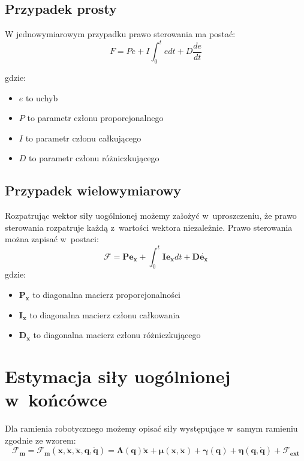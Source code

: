 \subsection{Przypadek prosty}
W jednowymiarowym przypadku prawo sterowania ma postać:
\begin{equation}
F = Pe + I\int_{0}^{t}e dt + D\frac{de}{dt}
\end{equation}

gdzie:
\begin{itemize}
	\item $e$ to uchyb
	\item $P$ to parametr członu proporcjonalnego
	\item $I$ to parametr członu całkującego
	\item $D$ to parametr członu różniczkującego
\end{itemize}


\subsection{Przypadek wielowymiarowy}
Rozpatrując wektor siły uogólnionej możemy założyć w~uproszczeniu, że prawo sterowania rozpatruje każdą z~wartości wektora niezależnie. Prawo sterowania można zapisać w~postaci:
\begin{equation}
\boldsymbol{\mathcal{F}} = \boldsymbol{P}\boldsymbol{e_x} +\int_{0}^{t}  \boldsymbol{I}\boldsymbol{e_x}dt + \boldsymbol{D}\dot{\boldsymbol{e_x}}
\end{equation}
gdzie:
\begin{itemize}
	\item $\boldsymbol{P_x}$ to diagonalna macierz proporcjonalności
	\item $\boldsymbol{I_x}$ to diagonalna macierz członu całkowania
	\item $\boldsymbol{D_x}$ to diagonalna macierz członu różniczkującego
\end{itemize}

\section{Estymacja siły uogólnionej w~końcówce}
\label{chap:estymacja}
Dla ramienia robotycznego możemy opisać siły występujące w~samym ramieniu zgodnie ze wzorem:
\begin{equation}
\boldsymbol{\mathcal{F}_m} = \boldsymbol{\mathcal{F}_m}(\boldsymbol{x}, \dot{\boldsymbol{x}}, \ddot{\boldsymbol{x}}, \boldsymbol{q}, \dot{\boldsymbol{q}}) = \boldsymbol{\Lambda}(\boldsymbol{q})\boldsymbol{\ddot{x}} + \boldsymbol{\mu}(\boldsymbol{x}, \boldsymbol{\dot{x}}) + \boldsymbol{\gamma}(\boldsymbol{q}) + \boldsymbol{\eta}(\boldsymbol{q}, \boldsymbol{\dot{q}}) + \boldsymbol{\mathcal{F}_{ext}}
\label{eq:ramie}
\end{equation}

